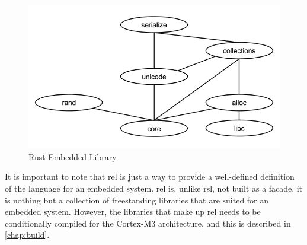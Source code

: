 \begin{figure}[H]
  \begin{center}
    \includegraphics[scale=0.3]{figures/background/rust/embedded-rust-lib.png}
  \end{center}
  \caption{Rust Embedded Library}
  \label{fig:rust:rel}
\end{figure}

It is important to note that \gls{rel} is just a way to provide a well-defined definition of the {\rust} language for an embedded system.
\gls{rel} is, unlike \gls{rsl}, not built as a facade, it is nothing but a collection of freestanding {\rust} libraries that are suited for an embedded system.
However, the libraries that make up \gls{rel} needs to be conditionally compiled for the Cortex-M3 architecture, and this is described in \autoref{chap:build}.
